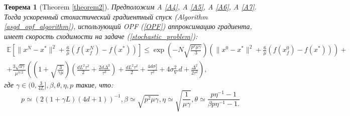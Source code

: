 \documentclass{article}
\newtheorem{theorem}{Теорема}
\begin{document}
\begin{theorem}[Theorem \ref{theorem2}]\label{theorem2_appendix}
   Предположим A \ref{A4}, A \ref{A5}, A \ref{A6}, A \ref{A7}. Тогда ускоренный стохастический градиентный спуск (Algorithm \ref{asgd_opf_algorithm}), использующий OPF (\ref{OPF}) аппроксимацию градиента, имеет скорость сходимости на задаче (\ref{stochastic_problem}):
\begin{equation}
    \begin{aligned}
    \mathbb{E}\left[\|x^N - x^*\|^2 + \frac{6}{\mu} (f(x_f^N) - f(x^*))\right] \leqslant \exp\left(- N\sqrt{\frac{p^2\mu\gamma}{3}}\right) \left(\|x^0 - x^*\|^2 + \frac{6}{\mu} (f(x_f^0) - f(x^*))\right) +\\+ \frac{3 \sqrt{3\gamma}}{\mu^{3/2}} \left(\left(1 + \sqrt{\frac{3}{\gamma\mu}}\right) \left(\frac{d L^2 \tau^2}{2} + \frac{2d\Delta^2}{\tau^2}\right) + \frac{d L^2 \tau^2}{2} + \frac{4 d \sigma_f^2}{\tau^2} + 4 \sigma_\nabla^2 d + \frac{\Delta^2}{2\tau^2}\right),
    \label{stochastic_convergence_opf_appendix}
    \end{aligned}
\end{equation}
где $\gamma \in (0, \frac{3}{4L}], \beta, \theta, \eta, p$ такие, что:
\begin{equation}
    p \simeq (2(1 + \gamma L)(4d + 1))^{-1}, \beta \simeq \sqrt{p^2 \mu \gamma}, \eta \simeq \sqrt{\frac{1}{\mu\gamma}}, \theta \simeq \frac{p \eta^{-1} - 1}{\beta p \eta^{-1} - 1.}
\end{equation}
\end{theorem}
\end{document}

